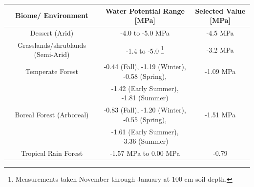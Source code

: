 \documentclass[12pt]{article}
\begin{document}
\begin{savenotes}
	\begin{table}[H]
		\begin{center}
			\begin{adjustbox}{width=1\textwidth}
			\begin{tabular}{|c c c|} 
				\hline
				Biome/ Environment & Water Potential Range [MPa] & Selected Value [MPa] \\ [0.5ex] 
				\hline\hline
				Dessert (Arid) & -4.0 to -5.0 MPa \cite{Nilsen1983} & -4.5 MPa \\ 
				\hline
				Grasslands/shrublands (Semi-Arid) & -1.4 to -5.0 \footnote{Measurements taken November through January at 100 cm soil depth.} \cite{Pelaez1994} & -3.2 MPa\\
				\hline
				Temperate Forest & -0.44 (Fall), -1.19 (Winter), -0.58 (Spring), & -1.09 MPa\\
				&-1.42 (Early Summer), -1.81 (Summer) \cite{Zobel2001}&\\
				\hline
				Boreal Forest (Arboreal) & -0.83 (Fall), -1.20 (Winter), -0.55 (Spring),& -1.51 MPa\\
				&-1.61 (Early Summer), -3.36 (Summer) \cite{Zobel2001} &\\
				\hline
				Tropical Rain Forest & -1.57 MPa to 0.00 MPa \cite{Kupers2019} & -0.79 \\
				\hline
			\end{tabular}
			\end{adjustbox}
		\vspace*{-3ex}
		\label{table4}
		\end{center}
	\end{table}
\end{savenotes}
\end{document}

